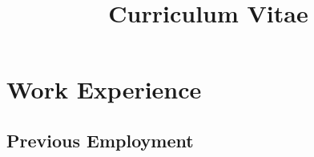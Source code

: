 \documentclass[11pt,a4paper,sans]{moderncv}        %
\title{Curriculum Vitae}                               %
\begin{document}
\makecvtitle

\section{Work Experience}

\vspace{5pt}

\subsection{Previous Employment}

\vspace{5pt}
\end{document}
